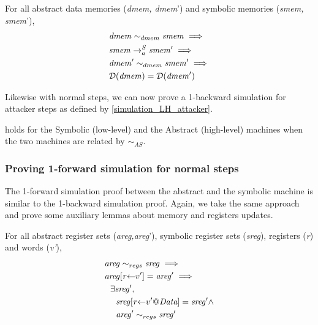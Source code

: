 \begin{lemma}
\label{dmem_attacker_preserves_domain}
  For all abstract data memories (\textit{dmem, dmem}')
  and symbolic memories (\textit{smem, smem}'),
  \begin{align*}
    & \mathit{dmem} \sim_{dmem} \mathit{smem} \implies \\
    & \stepa{\mathit{smem}}{\mathit{smem}'}{S} \implies \\
    & \mathit{dmem}' \sim_{dmem} \mathit{smem}' \implies \\
    & \mathcal{D}(\mathit{dmem}) = \mathcal{D}(\mathit{dmem}')
  \end{align*}
\end{lemma}

Likewise with normal steps, we can now prove a 1-backward
simulation for attacker steps as defined by \cref{simulation_LH_attacker}.

\begin{theorem}
\label{simulation_SA_attacker}
 holds for the Symbolic (low-level) and
the Abstract (high-level) machines when the two machines are related
by $\sim_{AS}$.
\end{theorem}

\subsubsection{Proving 1-forward simulation for normal steps}
\label{sec:forward_SA_normal}

The 1-forward simulation proof between the abstract and the symbolic
machine is similar to the 1-backward simulation proof. Again, we take
the same approach and prove some auxiliary lemmas about memory
and registers updates.

\begin{lemma}
\label{refine_registers_upd_fwd}
For all abstract register sets (\textit{areg,areg}'), symbolic
register sets (\textit{sreg}), registers (\textit{r}) and words
(\textit{v'}),
\begin{align*}
  & \mathit{areg} \sim_{regs} \mathit{sreg} \implies \\
  & \upd{\mathit{areg}}{\mathit{r}}{v'} = \mathit{areg'} \implies \\
  & ~~ \exists \mathit{sreg'}, \\
  & ~~~~ \upd{\mathit{sreg}}{\mathit{r}}{\atom{v'}{\DATA}} = \mathit{sreg'} \land \\
  & ~~~~  \mathit{areg'} \sim_{regs} \mathit{sreg'}
\end{align*}
\end{lemma}

